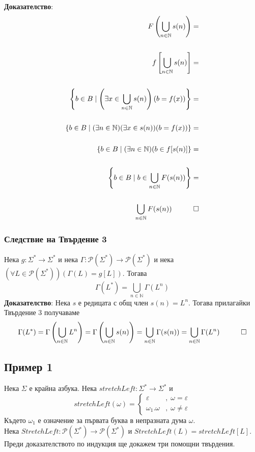 \documentclass[12pt]{article}
\begin{document}
\textbf{Доказателство}:
\begin{align*}
    F\left(\displaystyle\bigcup_{n \in \mathbb N} s(n) \right) = \\\\
    f\left[\displaystyle\bigcup_{n \in \mathbb N} s(n) \right] = \\\\
    \left\{b \in B \mid \left(\exists x \in \displaystyle\bigcup_{n \in \mathbb N} s(n) \right)(b = f(x)) \right\} = \\\\
    \{b \in B \mid (\exists n \in \mathbb N)(\exists x \in s(n))(b = f(x))\} = \\\\
    \{b \in B \mid (\exists n \in \mathbb N)(b \in f[s(n)]\} = \\\\
    \left\{b \in B \mid b \in \displaystyle\bigcup_{n \in \mathbb N} F(s(n)) \right\} = \\\\
    \displaystyle\bigcup_{n \in \mathbb N} F(s(n)) \quad \qed
\end{align*}

\subsubsection*{Следствие на Твърдение 3}
Нека \(g : \Sigma^* \to \Sigma^*\) и нека \(\Gamma : \mathcal{P}(\Sigma^*) \to \mathcal{P}(\Sigma^*)\)
и нека \((\forall L \in \mathcal{P}(\Sigma^*))(\Gamma(L) = g[L])\).
Тогава
\[\Gamma(L^*) = \displaystyle\bigcup_{n \in \mathbb N} \Gamma(L^n)\]
\textbf{Доказателство}: Нека \(s\) е редицата с общ член \(s(n) = L^n\).
Тогава прилагайки Твърдение 3 получаваме
\[\Gamma(L^*) = \Gamma\left(\displaystyle\bigcup_{n \in \mathbb N} L^n \right)
= \Gamma\left(\displaystyle\bigcup_{n \in \mathbb N} s(n) \right) = \displaystyle\bigcup_{n \in \mathbb N} \Gamma(s(n)) = \displaystyle\bigcup_{n \in \mathbb N} \Gamma(L^n) \quad \qed \]

\subsection*{Пример 1}
Нека \(\Sigma\) е крайна азбука.
Нека \(stretchLeft : \Sigma^* \to \Sigma^*\) и \[stretchLeft(\omega) = \begin{cases}
\varepsilon &,\; \omega = \varepsilon \\
\omega_1.\omega &,\; \omega \neq \varepsilon
\end{cases}\]
Където \(\omega_1\) е означение за първата буква в непразната дума \(\omega\). \\
Нека \(StretchLeft : \mathcal{P}(\Sigma^*) \to \mathcal{P}(\Sigma^*)\) и \(StretchLeft(L) = stretchLeft[L]\).
Преди доказателството по индукция ще докажем три помощни твърдения.
\end{document}
